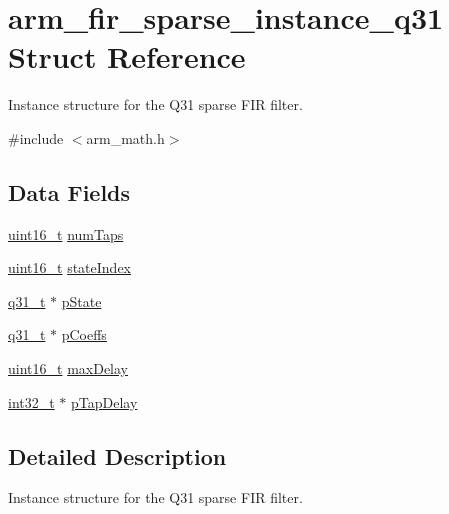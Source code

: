 \hypertarget{structarm__fir__sparse__instance__q31}{\section{arm\-\_\-fir\-\_\-sparse\-\_\-instance\-\_\-q31 Struct Reference}
\label{structarm__fir__sparse__instance__q31}
}


Instance structure for the Q31 sparse F\-I\-R filter.  




{\ttfamily \#include $<$arm\-\_\-math.\-h$>$}

\subsection*{Data Fields}
\begin{DoxyCompactItemize}
\item 
\hyperlink{stdint_8h_a273cf69d639a59973b6019625df33e30}{uint16\-\_\-t} \hyperlink{structarm__fir__sparse__instance__q31_a07b6c01e58ec6dde384719130d36b0dc}{num\-Taps}
\item 
\hyperlink{stdint_8h_a273cf69d639a59973b6019625df33e30}{uint16\-\_\-t} \hyperlink{structarm__fir__sparse__instance__q31_a557ed9d477e76e4ad2019344f19f568a}{state\-Index}
\item 
\hyperlink{arm__math_8h_adc89a3547f5324b7b3b95adec3806bc0}{q31\-\_\-t} $\ast$ \hyperlink{structarm__fir__sparse__instance__q31_a830be89daa5a393b225048889aa045d1}{p\-State}
\item 
\hyperlink{arm__math_8h_adc89a3547f5324b7b3b95adec3806bc0}{q31\-\_\-t} $\ast$ \hyperlink{structarm__fir__sparse__instance__q31_a093d6227f0d1597982cd083fb126f4e0}{p\-Coeffs}
\item 
\hyperlink{stdint_8h_a273cf69d639a59973b6019625df33e30}{uint16\-\_\-t} \hyperlink{structarm__fir__sparse__instance__q31_afdd3a1dc72132c854dc379154b68b674}{max\-Delay}
\item 
\hyperlink{group___n_a_m_e_gafd12020da5a235dfcf0c3c748fb5baed}{int32\-\_\-t} $\ast$ \hyperlink{structarm__fir__sparse__instance__q31_ab87ae457adec8f727afefaa2599fc983}{p\-Tap\-Delay}
\end{DoxyCompactItemize}


\subsection{Detailed Description}
Instance structure for the Q31 sparse F\-I\-R filter. 

